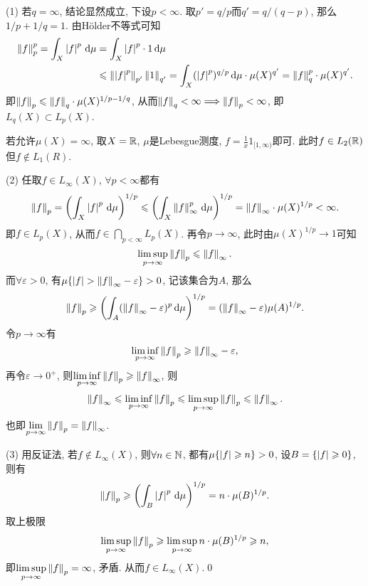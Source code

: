     \begin{Proof}
    (1) 若$ q=\infty $, 结论显然成立, 下设$ p<\infty $. 取$ p'=q/p $而$ q'=q/(q-p) $, 那么$ 1/p+1/q=1 $. 由H\"older不等式可知
    \[
    \begin{aligned}
    \left\| f \right\|_p^p=\int_X\left| f \right| ^p\,\mathrm{d}\mu&=\int_X\left| f \right| ^p\cdot 1\,\mathrm{d}\mu\\
    &\leqslant\left\| \left| f \right| ^p \right\|_{p'}\left\| 1 \right\|_{q'}=\int_X(\left| f \right| ^p)^{q/p}\,\mathrm{d}\mu\cdot\mu(X)^{q'}=\left\| f \right\|_q^p\cdot\mu(X)^{q'}.
    \end{aligned}
    \]
    即$ \left\| f \right\|_p\leqslant\left\| f \right\|_q\cdot\mu(X)^{1/p-1/q} $, 从而$ \left\| f \right\|_q<\infty\Longrightarrow\left\| f \right\|_p<\infty $, 即$ L_q(X)\subset L_p(X) $.

    若允许$ \mu(X)=\infty $, 取$ X=\mathbb{R} $, $ \mu $是Lebesgue测度, $ f=\frac{1}{x}1_{[1,\infty)} $即可. 此时$ f\in L_2(\mathbb{R}) $但$ f\notin L_1(R) $.

    (2) 任取$ f\in L_\infty(X) $, $ \forall p<\infty $都有
    \[
    \left\| f \right\|_p=\left(\int_X\left| f \right| ^p\,\mathrm{d}\mu\right)^{1/p}\leqslant\left(\int_X\left\| f \right\|_\infty^p\,\mathrm{d}\mu\right)^{1/p}=\left\| f \right\|_\infty\cdot\mu(X)^{1/p}<\infty.
    \]
    即$ f\in L_p(X) $, 从而$ f\in\bigcap_{p<\infty}L_p(X) $. 再令$ p\to\infty $, 此时由$ \mu(X)^{1/p}\to 1 $可知
    \[
    \limsup_{p\to\infty}\left\| f \right\|_p\leqslant\left\| f \right\|_\infty.
    \]
    而$ \forall\varepsilon>0 $, 有$ \mu\{ \left| f \right| >\left\| f \right\|_\infty-\varepsilon \}>0 $, 记该集合为$ A $, 那么
    \[
    \left\| f \right\|_p\geqslant\left(\int_A(\left\| f \right\|_\infty-\varepsilon)^p\,\mathrm{d}\mu\right)^{1/p}=(\left\| f \right\|_\infty-\varepsilon)\mu(A)^{1/p}.
    \]
    令$ p\to\infty $有
    \[
    \liminf_{p\to\infty}\left\| f \right\|_p\geqslant\left\| f \right\|_\infty-\varepsilon,
    \]
    再令$ \varepsilon\to 0^+ $, 则$ \liminf\limits_{p\to\infty}\left\| f \right\|_p\geqslant\left\| f \right\|_\infty $, 则
    \[
    \left\| f \right\|_\infty\leqslant\liminf_{p\to\infty}\left\| f \right\|_p\leqslant\limsup_{p\to\infty}\left\| f \right\|_p\leqslant\left\| f \right\|_\infty.
    \]
    也即$ \lim\limits_{p\to\infty}\left\| f \right\|_p=\left\| f \right\|_\infty $.

    (3) 用反证法, 若$ f\notin L_\infty(X) $, 则$ \forall n\in\mathbb{N} $, 都有$ \mu\{ \left| f \right| \geqslant n \}>0 $, 设$ B=\{ \left| f \right| \geqslant 0 \} $, 则有
    \[
    \left\| f \right\|_p\geqslant\left(\int_B\left| f \right| ^p\,\mathrm{d}\mu\right)^{1/p}=n\cdot\mu(B)^{1/p}.
    \]
    取上极限
    \[
    \limsup_{p\to\infty}\left\| f \right\|_p\geqslant\limsup_{p\to\infty}n\cdot\mu(B)^{1/p}\geqslant n,
    \]
    即$ \limsup\limits_{p\to\infty}\left\| f \right\|_p=\infty $, 矛盾. 从而$ f\in L_\infty(X) $.\qed
    \end{Proof}

